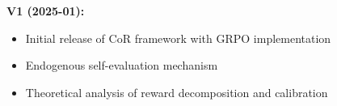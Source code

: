 \documentclass{article}
\theoremstyle{plain}
\theoremstyle{definition}
\theoremstyle{remark}
\begin{document}
\textbf{V1 (2025-01):}
\begin{itemize}
    \item Initial release of CoR framework with GRPO implementation
    \item Endogenous self-evaluation mechanism
    \item Theoretical analysis of reward decomposition and calibration
\end{itemize}
\end{document}
